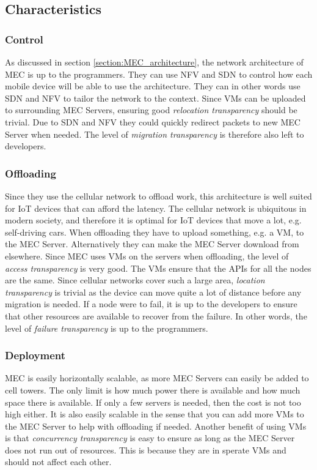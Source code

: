 





\subsection{Characteristics}
\subsubsection{Control}
As discussed in section \ref{section:MEC_architecture}, the network architecture of MEC is up to the programmers. They can use NFV and SDN to control how each mobile device will be able to use the architecture. They can in other words use SDN and NFV to tailor the network to the context. Since VMs can be uploaded to surrounding MEC Servers, ensuring good \textit{relocation transparency} should be trivial. Due to SDN and NFV they could quickly redirect packets to new MEC Server when needed. The level of \textit{migration transparency} is therefore also left to developers.

\subsubsection{Offloading}
Since they use the cellular network to offload work, this architecture is well suited for IoT devices that can afford the latency. The cellular network is ubiquitous in modern society, and therefore it is optimal for IoT devices that move a lot, e.g. self-driving cars. When offloading they have to upload something, e.g. a VM, to the MEC Server. Alternatively they can make the MEC Server download from elsewhere. Since MEC uses VMs on the servers when offloading, the level of \textit{access transparency} is very good. The VMs ensure that the APIs for all the nodes are the same. Since cellular networks cover such a large area, \textit{location transparency} is trivial as the device can move quite a lot of distance before any migration is needed. If a node were to fail, it is up to the developers to ensure that other resources are available to recover from the failure. In other words, the level of \textit{failure transparency} is up to the programmers.

\subsubsection{Deployment}
MEC is easily horizontally scalable, as more MEC Servers can easily be added to cell towers. The only limit is how much power there is available and how much space there is available. If only a few servers is needed, then the cost is not too high either. It is also easily scalable in the sense that you can add more VMs to the MEC Server to help with offloading if needed. Another benefit of using VMs is that \textit{concurrency transparency} is easy to ensure as long as the MEC Server does not run out of resources. This is because they are in sperate VMs and should not affect each other.



